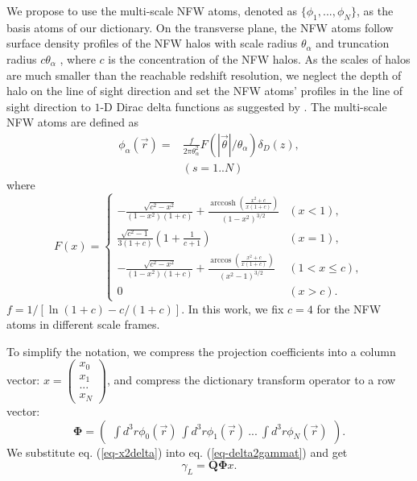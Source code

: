 \documentclass[twocolumn]{aastex62}
\DeclareMathOperator{\arccosh}{arccosh}
\begin{document}
We propose to use the multi-scale NFW atoms, denoted as
$\{\phi_1,...,\phi_N\}$, as the basis atoms of our dictionary.  On the
transverse plane, the NFW atoms follow surface density profiles of the NFW
halos \citep{haloModel-TJ2003-3pt} with scale radius $\theta_\alpha$ and
truncation radius $c \theta_\alpha$ , where $c$ is the concentration of the NFW
halos.  As the scales of halos are much smaller than the reachable redshift
resolution, we neglect the depth of halo on the line of sight direction and set
the NFW atoms' profiles in the line of sight direction to $1$-D Dirac delta
functions as suggested by \citep{LSS-massMap-Glimpse3D-Leonard2014}. The
multi-scale NFW atoms are defined as
\begin{equation}
\begin{split}
\phi_\alpha(\vec{r}) =&\frac{f }{2 \pi \theta_\alpha^2 }
F(|\vec{\theta}|/\theta_\alpha) \delta_D(z),\\
&  (s=1..N)
\end{split}
\end{equation}
where
\begin{equation}
F(x)=
\begin{cases}
-\frac{\sqrt{c^2-x^2}}{(1-x^2)(1+c)} + \frac{\arccosh
\left(\frac{x^2+c}{x(1+c)}\right)}{(1-x^2)^{3/2}}  & (x<1),\\
\frac{\sqrt{c^2-1}}{3(1+c)} (1+\frac{1}{c+1}) & (x=1),\\
-\frac{\sqrt{c^2-x^2}}{(1-x^2)(1+c)} +
\frac{\arccos\left(\frac{x^2+c}{x(1+c)}\right)}{(x^2-1)^{3/2}} & (1<x\leq c),\\
0& (x>c).
\end{cases}
\end{equation}
$f=1/[\ln (1+c)-c/(1+c)]$. In this work, we fix $c=4$ for the NFW atoms in
different scale frames.

To simplify the notation, we compress the projection coefficients into a column
vector:
$x=\begin{pmatrix}
x_{0}\\
x_{1}\\
...\\
x_{N}
\end{pmatrix}$,
and compress the dictionary transform operator to a row vector:
\begin{equation}
\mathbf{\Phi}=\begin{pmatrix}
\int d^3r\phi_0(\vec{r}) ~\int d^3r \phi_1(\vec{r})~ ...~\int d^3r \phi_{N}(\vec{r})
\end{pmatrix}.
\end{equation}
We substitute eq. (\ref{eq-x2delta}) into eq. (\ref{eq-delta2gammat}) and get
\begin{equation}\label{eq-x2gammat}
\gamma_L=\mathbf{Q}\mathbf{\Phi} x.
\end{equation}
\end{document}

